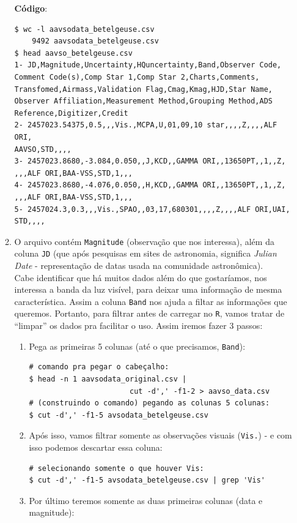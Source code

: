 \documentclass[a4paper,12pt]{article}
\begin{document}
\begin{enumerate}
\begin{enumerate}
        \textbf{Código}:
            \begin{lstlisting}[lang=bash]
$ wc -l aavsodata_betelgeuse.csv
    9492 aavsodata_betelgeuse.csv
$ head aavso_betelgeuse.csv
1- JD,Magnitude,Uncertainty,HQuncertainty,Band,Observer Code,
Comment Code(s),Comp Star 1,Comp Star 2,Charts,Comments,
Transfomed,Airmass,Validation Flag,Cmag,Kmag,HJD,Star Name,
Observer Affiliation,Measurement Method,Grouping Method,ADS
Reference,Digitizer,Credit
2- 2457023.54375,0.5,,,Vis.,MCPA,U,01,09,10 star,,,,Z,,,,ALF ORI,
AAVSO,STD,,,,
3- 2457023.8680,-3.084,0.050,,J,KCD,,GAMMA ORI,,13650PT,,1,,Z,
,,,ALF ORI,BAA-VSS,STD,1,,,
4- 2457023.8680,-4.076,0.050,,H,KCD,,GAMMA ORI,,13650PT,,1,,Z,
,,,ALF ORI,BAA-VSS,STD,1,,,
5- 2457024.3,0.3,,,Vis.,SPAO,,03,17,680301,,,,Z,,,,ALF ORI,UAI,
STD,,,,
        \end{lstlisting}
        \item O arquivo contém \texttt{Magnitude} (observação que nos interessa), além da coluna \texttt{JD} (que após pesquisas em sites de astronomia, significa \textit{Julian Date} - representação de datas usada na comunidade astronômica).\\
        Cabe identificar que há muitos dados além do que gostaríamos, nos interessa a banda da luz visível, para deixar uma informação de mesma característica. Assim a coluna \texttt{Band} nos ajuda a filtar as informações que queremos. Portanto, para filtrar antes de carregar no \texttt{R}, vamos tratar de ``limpar'' os dados pra facilitar o uso. Assim iremos fazer 3 passos:
        \begin{enumerate}
            \item Pega as primeiras 5 colunas (até o que precisamos, \texttt{Band}):
            \begin{lstlisting}[lang=bash]
# comando pra pegar o cabeçalho:
$ head -n 1 aavsodata_original.csv | 
                       cut -d',' -f1-2 > aavso_data.csv
# (construindo o comando) pegando as colunas 5 colunas:
$ cut -d',' -f1-5 avsodata_betelgeuse.csv
            \end{lstlisting} 
            \item Após isso, vamos filtrar somente as observações visuais (\texttt{Vis.}) - e com isso podemos descartar essa coluna:
            \begin{lstlisting}[lang=bash]
# selecionando somente o que houver Vis:
$ cut -d',' -f1-5 avsodata_betelgeuse.csv | grep 'Vis'
            \end{lstlisting}    
            \item Por último teremos somente as duas primeiras colunas (data e magnitude):\\
            \begin{lstlisting}[lang=bash]


\end{lstlisting}
\end{enumerate}
\end{enumerate}
\end{enumerate}
\end{document}
